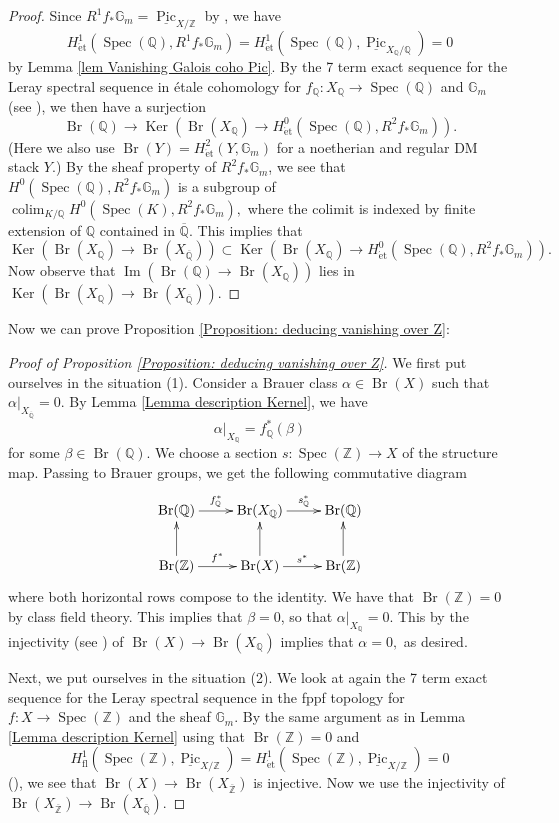 \documentclass{amsart}
\theoremstyle{definition}
\theoremstyle{remark}
\DeclareMathOperator{\Ker}{Ker}
\DeclareMathOperator{\Image}{Im}
\DeclareMathOperator{\Spec}{Spec}
\DeclareMathOperator{\Br}{Br}
\DeclareMathOperator{\Pic}{Pic}
\DeclareMathOperator{\colim}{colim}
\newcommand{\Q}{\mathbb{Q}}
\newcommand{\Qbar}{\overline{\mathbb{Q}}}
\newcommand{\ZZ}{\mathbb Z}
\newcommand{\QQ}{\mathbb Q}
\newcommand{\et}{\operatorname{\acute{e}t}}%
\begin{document}
\begin{proof}
Since $R^{1}f_{*}\mathbb{G}_{m}=\underline{\Pic}_{X/\ZZ}$
by \cite[Proposition 2.1.3]{BrochardPicardFunctorStack},
we have
$$
H^{1}_{\et}(\Spec(\Q),R^{1}f_{*}\mathbb{G}_{m})=H^{1}_{\et}(\Spec(\Q),\underline{\Pic}_{X_{\Q}/\Q})=0
$$
by Lemma \ref{lem Vanishing Galois coho Pic}.
By the 7 term exact sequence for the Leray spectral sequence in étale cohomology for $f_{\Q}\colon X_{\Q}\rightarrow \Spec(\Q)$ and $\mathbb{G}_{m}$ (see \cite[Théorème A.2.8.]{BrochardPicardFunctorStack}),
we then have a surjection
\[
\Br(\Q) \to \Ker(\Br(X_{\Q})\rightarrow H^{0}_{\et}(\Spec(\Q),R^{2}f_{*}\mathbb{G}_{m})).
\]
(Here we also use $\Br(Y)=H^{2}_{\et}(Y,\mathbb{G}_{m})$ for a noetherian and regular DM stack $Y$.)
By the sheaf property of
$R^{2}f_{*}\mathbb{G}_{m}$, we see that
$H^{0}(\Spec(\Q),R^{2}f_{*}\mathbb{G}_{m})$
is a subgroup of
$\colim_{K/\Q}H^{0}(\Spec(K),R^{2}f_{*}\mathbb{G}_{m}),$
where the colimit is indexed by finite extension of $\Q$ contained in $\overline{\Q}.$
This implies that
\[
\Ker(\Br(X_{\Q})\rightarrow \Br(X_{\Qbar})) \subset \Ker(\Br(X_{\Q})\rightarrow H^{0}_{\et}(\Spec(\Q),R^{2}f_{*}\mathbb{G}_{m})).
\]
Now observe that
$\Image(\Br(\Q)\rightarrow \Br(X_{\Q}))$
lies in
$\Ker(\Br(X_{\Q})\rightarrow \Br(X_{\Qbar}))$.
\end{proof}

Now we can prove Proposition \ref{Proposition: deducing vanishing over Z}:

\begin{proof}[Proof of Proposition \ref{Proposition: deducing vanishing over Z}]
We first put ourselves in the situation (1).
Consider a Brauer class
$\alpha\in \Br(X)$
such that $\alpha\vert_{X_{\Qbar}}=0.$
By Lemma \ref{Lemma description Kernel},
we have 
$$
\alpha\vert_{X_{\Q}}=f_{\Q}^{*}(\beta)
$$
for some $\beta\in \Br(\Q)$.
We choose a section $s\colon \Spec(\ZZ)\rightarrow X$ of the structure map.
Passing to Brauer groups, we get the following commutative diagram
$$
\xymatrix{
\Br(\Q) \ar[r]^-{f^*_{\QQ}}& \Br(X_{\Q}) \ar[r]^-{s^*_{\QQ}} &  \Br(\Q) \\
\Br(\ZZ) \ar[u] \ar[r]^-{f^*}& \Br(X) \ar[u] \ar[r]^-{s^*} & \Br(\ZZ) \ar[u],
}
$$
where both horizontal rows compose to the identity.
We have that $\Br(\ZZ)=0$ by class field theory.
This implies that $\beta=0$, so that $\alpha\vert_{X_{\Q}}=0$.
This by the injectivity
(see \cite[Proposition 2.5 (iv)]{AntieauMeierBrauerElliptic}) of
$\Br(X)\rightarrow \Br(X_{\Q})$
implies that $\alpha=0,$ as desired.

Next, we put ourselves in the situation (2).
We look at again
the 7 term exact sequence for the Leray spectral sequence in the fppf topology for $f\colon X\rightarrow \Spec(\ZZ)$ and the sheaf $\mathbb{G}_{m}$.
By the same argument as in Lemma \ref{Lemma description Kernel} using that $\Br(\ZZ)=0$ and 
$$
H^{1}_{\text{fl}}(\Spec(\ZZ),\underline{\Pic}_{X/\ZZ})=H^{1}_{\et}(\Spec(\ZZ),\underline{\Pic}_{X/\ZZ})=0
$$
(\cite[Chapter III, Theorem 3.9]{MilneEtCoho}),
we see that
$
\Br(X)\rightarrow \Br(X_{\overline{\ZZ}})
$
is injective.
Now we use the injectivity of
$\Br(X_{\overline{\ZZ}}) \to \Br(X_{\overline{\Q}})$.
\end{proof}
\end{document}
